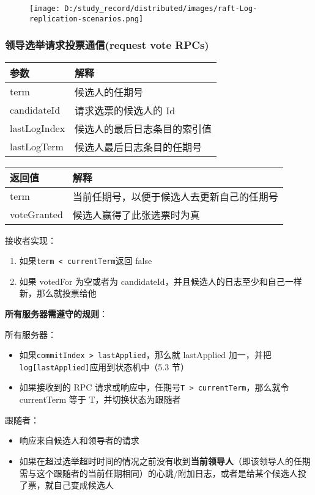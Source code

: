 \documentclass[
]{article}
\begin{document}
\begin{figure}
\centering
\texttt{[image: D:/study\_record/distributed/images/raft-Log-replication-scenarios.png]}
\caption{}
\end{figure}

\hypertarget{header-n124}{%
\subsubsection{领导选举请求投票通信(request vote
RPCs)}\label{header-n124}}

\begin{longtable}[]{@{}ll@{}}
\toprule
参数 & 解释\tabularnewline
\midrule
\endhead
term & 候选人的任期号\tabularnewline
candidateId & 请求选票的候选人的 Id\tabularnewline
lastLogIndex & 候选人的最后日志条目的索引值\tabularnewline
lastLogTerm & 候选人最后日志条目的任期号\tabularnewline
\bottomrule
\end{longtable}

\begin{longtable}[]{@{}ll@{}}
\toprule
返回值 & 解释\tabularnewline
\midrule
\endhead
term & 当前任期号，以便于候选人去更新自己的任期号\tabularnewline
voteGranted & 候选人赢得了此张选票时为真\tabularnewline
\bottomrule
\end{longtable}

接收者实现：

\begin{enumerate}
\def\labelenumi{\arabic{enumi}.}
\item
  如果\texttt{term\ \textless{}\ currentTerm}返回 false
\item
  如果 votedFor 为空或者为
  candidateId，并且候选人的日志至少和自己一样新，那么就投票给他
\end{enumerate}

\textbf{所有服务器需遵守的规则}：

所有服务器：

\begin{itemize}
\item
  如果\texttt{commitIndex\ \textgreater{}\ lastApplied}，那么就
  lastApplied 加一，并把\texttt{log{[}lastApplied{]}}应用到状态机中（5.3
  节）
\item
  如果接收到的 RPC
  请求或响应中，任期号\texttt{T\ \textgreater{}\ currentTerm}，那么就令
  currentTerm 等于 T，并切换状态为跟随者
\end{itemize}

跟随者：

\begin{itemize}
\item
  响应来自候选人和领导者的请求
\item
  如果在超过选举超时时间的情况之前没有收到\textbf{当前领导人}（即该领导人的任期需与这个跟随者的当前任期相同）的心跳/附加日志，或者是给某个候选人投了票，就自己变成候选人
\end{itemize}
\end{document}
